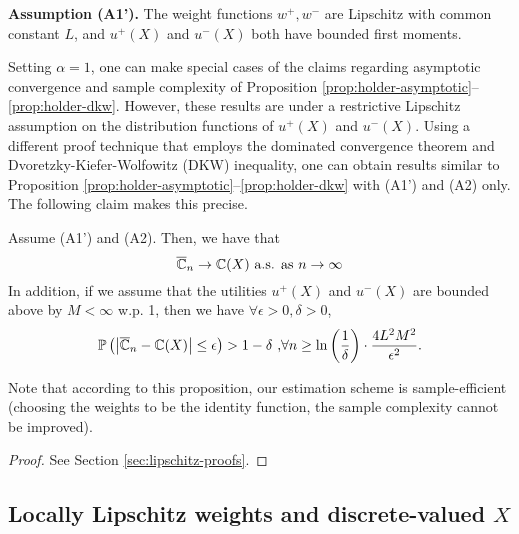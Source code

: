 \noindent\textbf{Assumption (A1').}  The weight functions $w^+, w^-$ are Lipschitz with common constant $L$, and 
$u^+(X)$ and $u^-(X)$ both have bounded first moments.

Setting $\alpha=1$, one can make special cases of the claims regarding asymptotic convergence and sample complexity of Proposition \ref{prop:holder-asymptotic}--\ref{prop:holder-dkw}. However, these results are under  a restrictive Lipschitz assumption on the distribution functions of $u^+(X)$ and $u^-(X)$. Using a different proof technique that employs the dominated convergence theorem and Dvoretzky-Kiefer-Wolfowitz (DKW) inequality, one can obtain results similar to Proposition \ref{prop:holder-asymptotic}--\ref{prop:holder-dkw} with (A1') and (A2) only. The following claim makes this precise.

\begin{proposition}
\label{prop:lipschitz}
Assume (A1') and (A2). Then, we have that 
$$\overline {\mathbb{C}}_n
\rightarrow
\mathbb{C}(X)
 \text{   a.s. as } n\rightarrow \infty
$$
In addition, if we assume that the utilities $u^+(X)$ and $u^-(X)$ are bounded above by $M<\infty$ w.p. 1, then we have $\forall \epsilon >0, \delta >0$, 
$$
\mathbb{P}\left( \left |\overline {\mathbb{C}}_n- \mathbb{C}(X) \right| \leq  \epsilon  \right) > 1-\delta\text{     ,} \forall n \geq \ln\left(\frac{1}{\delta}\right)\cdot 
\frac{4L^2 M^2}{\epsilon^{2}}.
$$
\end{proposition}
Note that according to this proposition, our estimation scheme is sample-efficient (choosing the weights to be the identity function, the sample complexity cannot be improved).
\begin{proof}
See Section \ref{sec:lipschitz-proofs}.
\end{proof}

\subsection{Locally Lipschitz weights and discrete-valued $X$}

